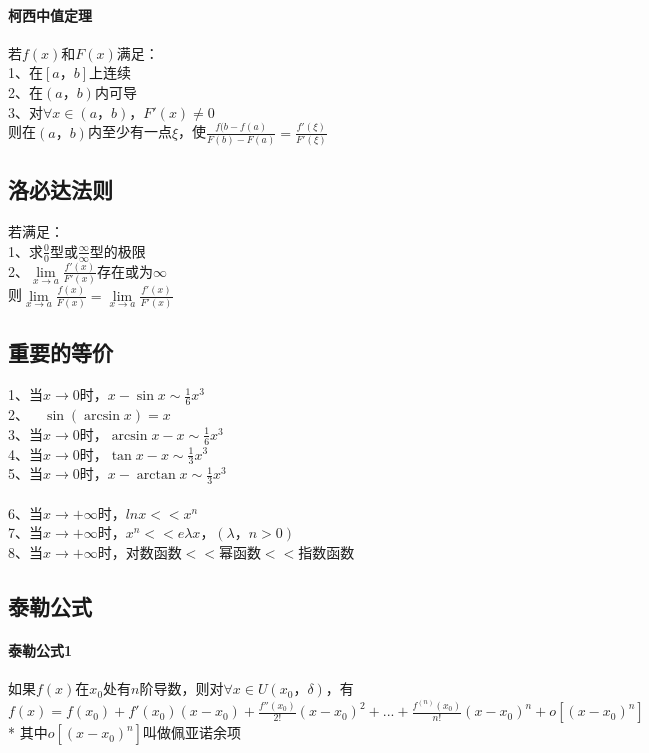 \documentclass{article}
\begin{document}
\begin{flushleft}
	\paragraph{柯西中值定理}
	若$f(x)$和$F(x)$满足：\\
	1、在$[a，b]$上连续\\
	2、在$(a，b)$内可导\\
	3、对$\forall x\in (a，b)，F'(x)\neq 0$\\
	则在$(a，b)$内至少有一点$\xi$，使$\frac{f(b-f(a)}{F(b)-F(a)}=\frac{f'(\xi)}{F'(\xi)}$\\
	
	\subsection{洛必达法则}
	
	若满足：\\
	1、求$\frac{0}{0}$型或$\frac{\infty}{\infty}$型的极限\\
	2、$\lim\limits_{x\to a}\frac{f'(x)}{F'(x)}$存在或为$\infty$\\
	则$\lim\limits_{x\to a}\frac{f(x)}{F(x)}=\lim\limits_{x\to a}\frac{f'(x)}{F'(x)}$\\
	
	\subsection{重要的等价}
	
	1、当$x\to 0$时，$x-\sin x \sim \frac{1}{6}x^3$\\
	2、\ \ $\sin(\arcsin x)=x$\\
	3、当$x\to 0$时，$\arcsin x-x \sim \frac{1}{6}x^3$\\
	4、当$x\to 0$时，$\tan x-x \sim \frac{1}{3}x^3$\\
	5、当$x\to 0$时，$x-\arctan x \sim \frac{1}{3}x^3$\\
	~\\
	6、当$x\to +\infty$时，$lnx << x^n$\\
	7、当$x\to +\infty$时，$x^n << e{\lambda x}，(\lambda，n>0)$\\
	8、当$x\to +\infty$时，对数函数$<<$幂函数$<<$指数函数\\
	
	\subsection{泰勒公式}
	
	\paragraph{泰勒公式1}
	如果$f(x)$在$x_0$处有$n$阶导数，则对$\forall x \in U(x_0，\delta)$，有$f(x)=f(x_0)+f'(x_0)(x-x_0)+\frac{f''(x_0)}{2!}(x-x_0)^2+...+\frac{f^{(n)}(x_0)}{n!}(x-x_0)^n+o[(x-x_0)^n]$\\
	* 其中$o[(x-x_0)^n]$叫做佩亚诺余项\\
	~\\

\end{flushleft}
\end{document}
